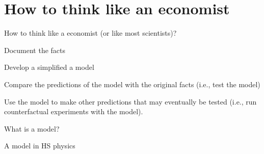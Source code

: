 \documentclass[notes,11pt, aspectratio=169, xcolor=table]{beamer}
\newenvironment{wideitemize}{\itemize\addtolength{\itemsep}{10pt}}{\enditemize}
\begin{document}
\section{How to think like an economist}

\begin{frame}{How to think like a economist  (or like most scientists)?}
 \begin{wideitemize}
    \item Document the facts
    \item Develop a simplified a model
    \item Compare the predictions of the model with the original facts (i.e., test the model)
    \item Use the model to make other predictions that may eventually be tested (i.e., run counterfactual experiments with the model).
 \end{wideitemize}
\end{frame}


\begin{frame}{What is a model?}
  \end{frame}

\begin{frame}{A model in HS physics}
    
    \end{frame}
\end{document}
